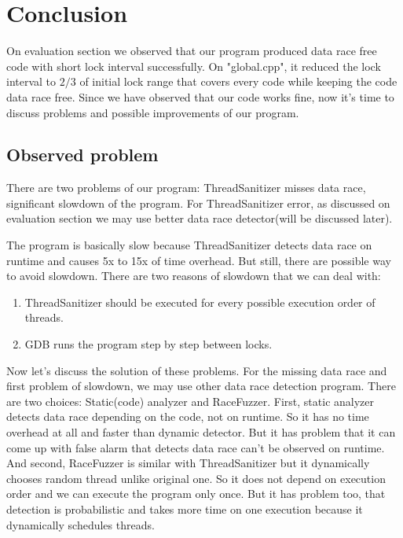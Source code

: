 \section{Conclusion}
\label{sec:conclusion}

On evaluation section we observed that our program produced data race free code with short lock interval successfully. On "global.cpp", it reduced the lock interval to $2/3$ of initial lock range that covers every code while keeping the code data race free. Since we have observed that our code works fine, now it's time to discuss problems and possible improvements of our program.

\subsection{Observed problem}
There are two problems of our program: ThreadSanitizer misses data race, significant slowdown of the program. For ThreadSanitizer error, as discussed on evaluation section we may use better data race detector(will be discussed later).

The program is basically slow because ThreadSanitizer detects data race on runtime and causes 5x to 15x of time overhead. But still, there are possible way to avoid slowdown. There are two reasons of slowdown that we can deal with:

\begin{enumerate}
    \item ThreadSanitizer should be executed for every possible execution order of threads.
    \item GDB runs the program step by step between locks.
\end{enumerate}

Now let's discuss the solution of these problems. For the missing data race and first problem of slowdown, we may use other data race detection program. There are two choices: Static(code) analyzer and RaceFuzzer. First, static analyzer detects data race depending on the code, not on runtime. So it has no time overhead at all and faster than dynamic detector. But it has problem that it can come up with false alarm that detects data race can't be observed on runtime. And second, RaceFuzzer is similar with ThreadSanitizer but it dynamically chooses random thread unlike original one. So it does not depend on execution order and we can execute the program only once. But it has problem too, that detection is probabilistic and takes more time on one execution because it dynamically schedules threads.

